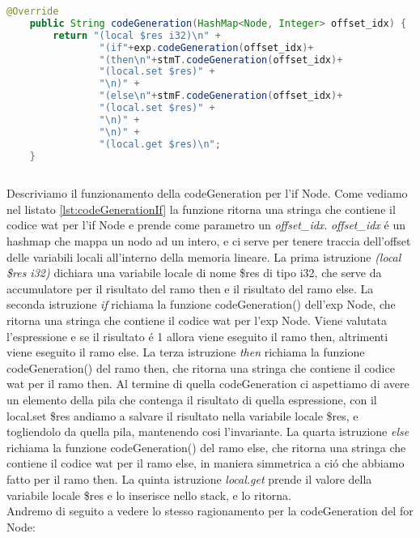 \documentclass[../../main.tex]{subfiles}
\begin{document}
\begin{lstlisting}[language=Java, caption={codeGeneration() per l'if Node}, label={lst:codeGenerationIf}]
    @Override
    public String codeGeneration(HashMap<Node, Integer> offset_idx) {
        return "(local $res i32)\n" +
                "(if"+exp.codeGeneration(offset_idx)+
                "(then\n"+stmT.codeGeneration(offset_idx)+
                "(local.set $res)" +
                "\n)" +
                "(else\n"+stmF.codeGeneration(offset_idx)+
                "(local.set $res)" +
                "\n)" +
                "\n)" +
                "(local.get $res)\n";
    }
    
\end{lstlisting}
Descriviamo il funzionamento della codeGeneration per l'if Node. Come vediamo nel listato \ref{lst:codeGenerationIf} la funzione ritorna una stringa che contiene il codice wat per l'if Node e prende come parametro un \textit{offset\_idx}.
\textit{offset\_idx} é un hashmap che mappa un nodo ad un intero, e ci serve per tenere traccia dell'offset delle variabili locali all'interno della memoria lineare.
La prima istruzione \textit{(local \$res i32)} dichiara una variabile locale di nome \$res di tipo i32, che serve da accumulatore per il risultato del ramo then e il risultato del ramo else.
La seconda istruzione \textit{if} richiama la funzione codeGeneration() dell'exp Node, che ritorna una stringa che contiene il codice wat per l'exp Node.
Viene valutata l'espressione e se il risultato é 1 allora viene eseguito il ramo then, altrimenti viene eseguito il ramo else.
La terza istruzione \textit{then} richiama la funzione codeGeneration() del ramo then, che ritorna una stringa che contiene il codice wat per il ramo then.
Al termine di quella codeGeneration ci aspettiamo di avere un elemento della pila che contenga il risultato di quella espressione, con il local.set \$res andiamo a salvare il risultato nella variabile locale \$res, e togliendolo da quella pila, mantenendo cosi l'invariante.
La quarta istruzione \textit{else} richiama la funzione codeGeneration() del ramo else, che ritorna una stringa che contiene il codice wat per il ramo else, in maniera simmetrica a ció che abbiamo fatto per il ramo then.
La quinta istruzione \textit{local.get} prende il valore della variabile locale \$res e lo inserisce nello stack, e lo ritorna.\\

Andremo di seguito a vedere lo stesso ragionamento per la codeGeneration del for Node:
    
\end{document}
